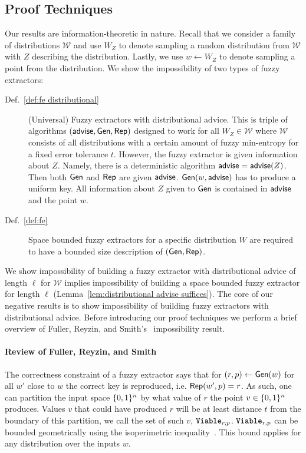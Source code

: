 \subsection{Proof Techniques}
Our results are information-theoretic in nature. Recall that we consider a family of distributions $\mathcal{W}$ and use $W_Z$ to denote sampling a random distribution from $\mathcal{W}$ with $Z$ describing the distribution.  Lastly, we use $w\leftarrow W_Z$ to denote sampling a point from the distribution.  We show the impossibility of two types of fuzzy extractors:
\begin{description}
\item[Def.~\ref{def:fe distributional}] (Universal) Fuzzy extractors with distributional advice.  This is triple of algorithms $({\mathsf{advise}}, {\mathsf{Gen}}, {\mathsf{Rep}})$ designed to work for all $W_Z \in \mathcal{W}$ where $\mathcal{W}$ consists of all distributions with a certain amount of fuzzy min-entropy for a fixed error tolerance $t$.  However, the fuzzy extractor is given information about $Z$.  Namely, there is a deterministic algorithm ${\mathsf{advise}} = {\mathsf{advise}}(Z)$. Then both ${\mathsf{Gen}}$ and ${\mathsf{Rep}}$ are given ${\mathsf{advise}}$. ${\mathsf{Gen}}(w, {\mathsf{advise}})$ has to produce a uniform key.  All information about $Z$ given to ${\mathsf{Gen}}$ is contained in ${\mathsf{advise}}$ and the point $w$.
\item[Def.~\ref{def:fe}] Space bounded fuzzy extractors for a specific distribution $W$ are required to have a bounded size description of $({\mathsf{Gen}}, {\mathsf{Rep}})$.
\end{description}

We show impossibility of building a fuzzy extractor with distributional advice of length $\ell$ for $\mathcal{W}$ implies impossibility of building a space bounded fuzzy extractor for length $\ell$ (Lemma~\ref{lem:distributional advise suffices}). 
The core of our negative results is to show impossibility of building fuzzy extractors with distributional advice.   Before introducing our proof techniques we perform a brief overview of Fuller, Reyzin, and Smith's~\cite{fuller2020fuzzy} impossibility result.

\paragraph{Review of Fuller, Reyzin, and Smith~\cite{fuller2020fuzzy}}
The correctness constraint of a fuzzy extractor says that for $(r, p)\leftarrow {\ensuremath{\mathsf{Gen}}}(w)$ for all $w'$ close to $w$ the correct key is reproduced, i.e. ${\mathsf{Rep}}(w', p)=r$.  As such, one can partition the input space $\{0, 1\}^n$ by what value of $r$ the point  $v\in \{0, 1\}^n$ produces.  Values $v$ that could have produced  $r$ will be at least distance $t$ from the boundary of this partition, we call the set of such $v$, $\mathtt{Viable}_{r,p}$.  $\mathtt{Viable}_{r,p}$ can be bounded geometrically using the isoperimetric inequality~\cite{harper1966optimal}.  This bound applies for any distribution over the inputs $w$.

